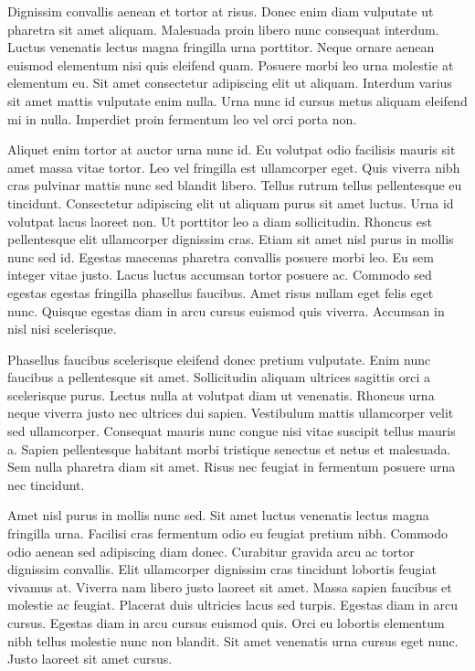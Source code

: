 \documentclass[11pt,a4paper]{article}
\begin{document}
Dignissim convallis aenean et tortor at risus. Donec enim diam vulputate ut pharetra sit amet aliquam. Malesuada proin libero nunc consequat interdum. Luctus venenatis lectus magna fringilla urna porttitor. Neque ornare aenean euismod elementum nisi quis eleifend quam. Posuere morbi leo urna molestie at elementum eu. Sit amet consectetur adipiscing elit ut aliquam. Interdum varius sit amet mattis vulputate enim nulla. Urna nunc id cursus metus aliquam eleifend mi in nulla. Imperdiet proin fermentum leo vel orci porta non.

Aliquet enim tortor at auctor urna nunc id. Eu volutpat odio facilisis mauris sit amet massa vitae tortor. Leo vel fringilla est ullamcorper eget. Quis viverra nibh cras pulvinar mattis nunc sed blandit libero. Tellus rutrum tellus pellentesque eu tincidunt. Consectetur adipiscing elit ut aliquam purus sit amet luctus. Urna id volutpat lacus laoreet non. Ut porttitor leo a diam sollicitudin. Rhoncus est pellentesque elit ullamcorper dignissim cras. Etiam sit amet nisl purus in mollis nunc sed id. Egestas maecenas pharetra convallis posuere morbi leo. Eu sem integer vitae justo. Lacus luctus accumsan tortor posuere ac. Commodo sed egestas egestas fringilla phasellus faucibus. Amet risus nullam eget felis eget nunc. Quisque egestas diam in arcu cursus euismod quis viverra. Accumsan in nisl nisi scelerisque.

Phasellus faucibus scelerisque eleifend donec pretium vulputate. Enim nunc faucibus a pellentesque sit amet. Sollicitudin aliquam ultrices sagittis orci a scelerisque purus. Lectus nulla at volutpat diam ut venenatis. Rhoncus urna neque viverra justo nec ultrices dui sapien. Vestibulum mattis ullamcorper velit sed ullamcorper. Consequat mauris nunc congue nisi vitae suscipit tellus mauris a. Sapien pellentesque habitant morbi tristique senectus et netus et malesuada. Sem nulla pharetra diam sit amet. Risus nec feugiat in fermentum posuere urna nec tincidunt.

Amet nisl purus in mollis nunc sed. Sit amet luctus venenatis lectus magna fringilla urna. Facilisi cras fermentum odio eu feugiat pretium nibh. Commodo odio aenean sed adipiscing diam donec. Curabitur gravida arcu ac tortor dignissim convallis. Elit ullamcorper dignissim cras tincidunt lobortis feugiat vivamus at. Viverra nam libero justo laoreet sit amet. Massa sapien faucibus et molestie ac feugiat. Placerat duis ultricies lacus sed turpis. Egestas diam in arcu cursus. Egestas diam in arcu cursus euismod quis. Orci eu lobortis elementum nibh tellus molestie nunc non blandit. Sit amet venenatis urna cursus eget nunc. Justo laoreet sit amet cursus.
\end{document}
